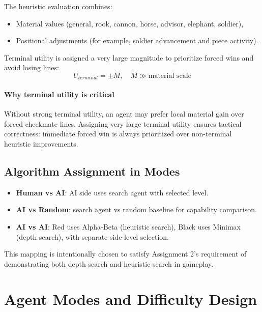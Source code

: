 \documentclass[a4paper,12pt]{article}
\begin{document}
The heuristic evaluation combines:
\begin{itemize}
    \item Material values (general, rook, cannon, horse, advisor, elephant, soldier),
    \item Positional adjustments (for example, soldier advancement and piece activity).
\end{itemize}

Terminal utility is assigned a very large magnitude to prioritize forced wins and avoid losing lines:
\[
U_{terminal} = \pm M, \quad M \gg \text{material scale}
\]

\paragraph{Why terminal utility is critical}
Without strong terminal utility, an agent may prefer local material gain over forced checkmate lines. Assigning very large terminal utility ensures tactical correctness: immediate forced win is always prioritized over non-terminal heuristic improvements.

\subsection{Algorithm Assignment in Modes}

\begin{itemize}
  \item \textbf{Human vs AI}: AI side uses search agent with selected level.
  \item \textbf{AI vs Random}: search agent vs random baseline for capability comparison.
  \item \textbf{AI vs AI}: Red uses Alpha-Beta (heuristic search), Black uses Minimax (depth search), with separate side-level selection.
\end{itemize}

This mapping is intentionally chosen to satisfy Assignment 2's requirement of demonstrating both depth search and heuristic search in gameplay.


\section{Agent Modes and Difficulty Design}
\end{document}
